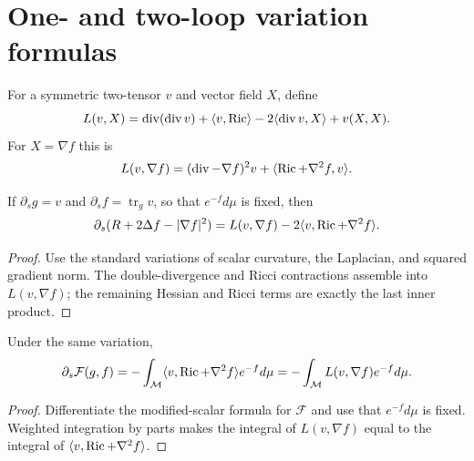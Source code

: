 \section{One- and two-loop variation formulas}

\begin{definition}
\label{def:chow-iii-ch17-linear-trace-harnack}

For a symmetric two-tensor $v$ and vector field $X$, define
\[
 L(v,X)=\operatorname{div}(\operatorname{div}v)+\langle v,\operatorname{Ric}\rangle
 -2\langle\operatorname{div}v,X\rangle+v(X,X).
\]
For $X=\nabla f$ this is
\[
 L(v,\nabla f)=(\operatorname{div}-\nabla f)^2v
 +\langle\operatorname{Ric}+\nabla^2f,v\rangle.
\]
\end{definition}

\begin{lemma}
\label{lem:chow-iii-ch17-modified-scalar-variation}


If $\partial_sg=v$ and $\partial_sf=\operatorname{tr}_gv$, so that
$e^{-f}d\mu$ is fixed, then
\[
 \partial_s(R+2\Delta f-|\nabla f|^2)
 =L(v,\nabla f)-2\langle v,\operatorname{Ric}+\nabla^2f\rangle.
\]
\end{lemma}
\begin{proof}
\sketch Use the standard variations of scalar curvature, the Laplacian, and squared
gradient norm.  The double-divergence and Ricci contractions assemble into
$L(v,\nabla f)$; the remaining Hessian and Ricci terms are exactly the last
inner product.
\end{proof}

\begin{lemma}
\label{lem:chow-iii-ch17-perelman-energy-first-variation}


Under the same variation,
\[
 \partial_s\mathcal F(g,f)=-\int_{\mathcal M}
 \langle v,\operatorname{Ric}+\nabla^2f\rangle e^{-f}d\mu
 =-\int_{\mathcal M}L(v,\nabla f)e^{-f}d\mu.
\]
\end{lemma}
\begin{proof}
\sketch Differentiate the modified-scalar formula for $\mathcal F$ and use that
$e^{-f}d\mu$ is fixed.  Weighted integration by parts makes the integral of
$L(v,\nabla f)$ equal to the integral of
$\langle v,\operatorname{Ric}+\nabla^2f\rangle$.
\end{proof}

